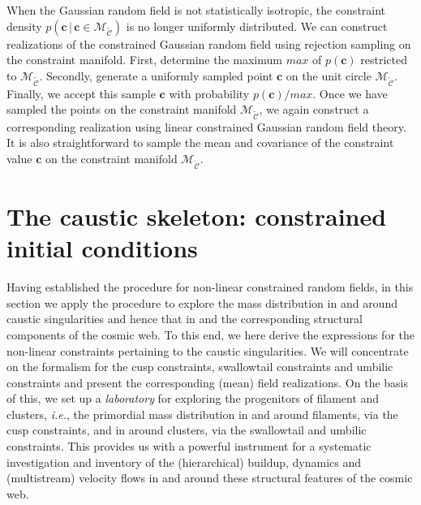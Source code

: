 \documentclass[a4paper, 11pt]{article}
\begin{document}
When the Gaussian random field is not statistically isotropic, the constraint density $p(\bm{c}\, |\, \bm{c}\in\mathcal{M}_\mathcal{\tilde C})$ is no longer uniformly distributed. We can construct realizations of the constrained Gaussian random field using rejection sampling on the constraint manifold. First, determine the maximum $max$ of $p(\bm{c})$ restricted to $\mathcal{M}_\mathcal{\tilde C}$. Secondly, generate a uniformly sampled point $\bm{c}$ on the unit circle $\mathcal{M}_\mathcal{\tilde C}$. Finally, we accept this sample $\bm{c}$ with probability $p(\bm{c})/max$. Once we have sampled the points on the constraint manifold $\mathcal{M}_\mathcal{\tilde C}$, we again construct a corresponding realization using linear constrained Gaussian random field theory. It is also straightforward to sample the mean and covariance of the constraint value $\bm{c}$ on the constraint manifold $\mathcal{M}_\mathcal{\tilde C}$.

\section{The caustic skeleton: constrained initial conditions}\label{sec:caustic_skeleton_constraints}
Having established the procedure for non-linear constrained random fields, in this section we apply the procedure to explore the mass distribution in and around caustic singularities and hence that in and the corresponding structural components of the cosmic web. To this end, we here derive the expressions for the non-linear constraints pertaining to the caustic singularities. We will concentrate on the formalism for the cusp constraints, swallowtail constraints and umbilic constraints and present the corresponding (mean) field realizations. On the basis of this, we set up a \textit{laboratory} for exploring the progenitors of filament and clusters, \textit{i.e.}, the primordial mass distribution in and around filaments, via the cusp constraints, and in around clusters, via the swallowtail and umbilic constraints. This provides us with a powerful instrument for a systematic investigation and inventory of the (hierarchical) buildup, dynamics and (multistream) velocity flows in and around these structural features of the cosmic web.  

\end{document}

